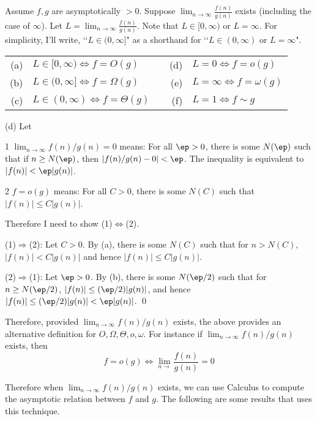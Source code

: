 \begin{prop}
Assume $f, g$ are asymptotically $> 0$.
Suppose $\displaystyle \lim_{n \rightarrow \infty} \frac{f(n)}{g(n)}$ exists (including the case of $\infty$).
Let $L = \displaystyle \lim_{n \rightarrow \infty} \frac{f(n)}{g(n)}$.
Note that $L \in [0, \infty)$ or $L = \infty$.
For simplicity, I'll write, \lq\lq $L \in (0, \infty]$" as a shorthand for
\lq\lq $L \in (0, \infty)$ or $L = \infty$".
\begin{longtable}{rlcrl}
\textnormal{(a)} & $L \in [0, \infty) \iff f = O(g)$      & \hspace{1cm} & \textnormal{(d)} & $L = 0 \iff f = o(g)$  \\
\textnormal{(b)} & $L \in (0, \infty] \iff f = \Omega(g)$ & \hspace{1cm} & \textnormal{(e)} & $L = \infty \iff f = \omega(g)$ \\
\textnormal{(c)} & $L \in (0, \infty) \iff f = \Theta(g)$ & \hspace{1cm} & \textnormal{(f)} & $L = 1 \iff f \sim g$
\end{longtable}
\end{prop}
\proof
(d)
Let
\begin{myenum}
\item[1] $\lim_{n\rightarrow \infty} f(n)/g(n) = 0$ means:
  For all $\ep > 0$, there is some $N(\ep)$ such that
if $n \geq N(\ep)$, then $|f(n)/g(n) - 0| < \ep$.
The inequality is equivalent to $|f(n)| < \ep |g(n)|$.
\item[2] $f = o(g)$ means: For all $C > 0$, there is some $N(C)$ such that
$|f(n)| \leq C |g(n)|$.
\end{myenum}
Therefore I need to show (1)$\Longleftrightarrow$(2).

(1)$\Longrightarrow$(2):
Let $C > 0$. By (a), there is some $N(C)$ such that
for $n > N(C)$, $|f(n)| < C|g(n)|$ and hence $|f(n)| \leq C|g(n)|$.

(2)$\Longrightarrow$(1):
Let $\ep > 0$.
By (b), there is some $N(\ep/2)$ such that
for $n \geq N(\ep/2)$, $|f(n)| \leq (\ep/2)|g(n)|$, and hence
$|f(n)| \leq (\ep/2)|g(n)| < \ep |g(n)|$.
\qed

Therefore,
provided
$\displaystyle\lim_{n \rightarrow \infty} f(n)/g(n)$
exists, the above provides an alternative definition
for $O, \Omega, \Theta, o, \omega$.
For instance if $\displaystyle\lim_{n \rightarrow \infty} f(n)/g(n)$ exists,
then
\[
f = o(g) \iff \lim_{n \rightarrow} \frac{f(n)}{g(n)} = 0
\]


Therefore when $\displaystyle \lim_{n \rightarrow \infty} f(n)/g(n)$ exists, we can use Calculus to compute the
asymptotic relation between $f$ and $g$.
The following are some results that uses this technique.

